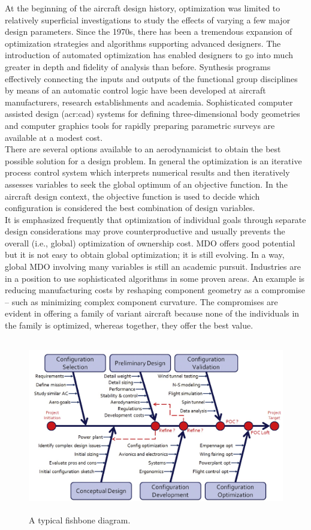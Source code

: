 At the beginning of the aircraft design history, optimization was limited to relatively superficial investigations to study the effects of varying a few major design parameters. 
Since the 1970s, there has been a tremendous expansion of optimization strategies and algorithms supporting advanced designers. The introduction of automated optimization has enabled designers to go into much greater in depth and fidelity of analysis than before. Synthesis programs effectively connecting the inputs and outputs of the functional group disciplines by means of an automatic control logic have been developed at aircraft manufacturers, research establishments and academia. Sophisticated computer assisted design (\gls{acr:cad}) systems for defining three-dimensional body geometries and computer graphics tools for rapidly preparing parametric surveys are available at a modest cost.\\
There are several options available to an aerodynamicist to obtain the best possible solution for a design problem. In general the optimization is an iterative process control system which interprets numerical results and then iteratively assesses variables to seek the global optimum of an objective function. In the aircraft design context, the objective function is used to decide which configuration is considered the best combination of design variables.\cite{torenbeek2013advanced} \\
It is emphasized frequently that optimization of individual goals through separate design considerations may prove counterproductive and usually prevents the overall (i.e., global) optimization of ownership cost.  \gls{MDO} offers good potential but it is not easy to obtain global optimization; it is still evolving. In a way, global  \gls{MDO} involving many variables is still an academic pursuit. Industries are in a position to use sophisticated algorithms in some proven areas. An example is reducing manufacturing costs by reshaping component geometry as a compromise – such as minimizing complex component curvature. The compromises are evident in offering a family of variant aircraft because none of the individuals in the family is optimized, whereas together, they offer the best value.\\
\begin{figure}[H]
\centering
\includegraphics[height=7.6cm]{Immagini/Fishbone}
\caption{A typical fishbone diagram.}
\label{comp}
\end{figure}


